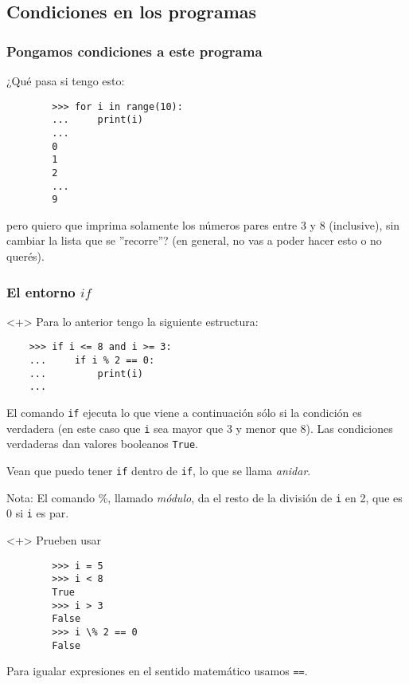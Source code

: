 \documentclass{beamer}
\begin{document}
\subsection{Condiciones en los programas}

\begin{frame}[fragile]
    \frametitle{Pongamos condiciones a este programa}
    ¿Qué pasa si tengo esto:
    \begin{verbatim}
        >>> for i in range(10):
        ...     print(i)
        ...
        0
        1
        2
        ...
        9
    \end{verbatim}
    pero quiero que imprima solamente los números pares entre 3 y 8 (inclusive), sin cambiar la lista que se ''recorre''? \footnotesize{(en general, no vas a poder hacer esto o no querés)}.
\end{frame}

\begin{frame}[fragile]
    \frametitle{El entorno $if$}
    \begin{onlyenv}<+>
    Para lo anterior tengo la siguiente estructura:
    \begin{verbatim}
    >>> if i <= 8 and i >= 3:
    ...     if i % 2 == 0:
    ...         print(i)
    ...
    \end{verbatim}
    El comando \texttt{if} ejecuta lo que viene a continuación sólo si la condición es verdadera (en este caso que \texttt{i} sea mayor que 3 y menor que 8). Las condiciones verdaderas dan valores booleanos \texttt{True}. 
    
    Vean que puedo tener \texttt{if} dentro de \texttt{if}, lo que se llama \textit{anidar}. 
    
    \vspace{5mm}
    \tiny{Nota: El comando \%, llamado \textit{módulo}, da el resto de la división de \texttt{i} en 2, que es 0 si \texttt{i} es par.}
    \end{onlyenv}
    
    
    \begin{onlyenv}<+>
        Prueben usar
        \begin{verbatim}
        >>> i = 5
        >>> i < 8
        True
        >>> i > 3
        False
        >>> i \% 2 == 0
        False
        \end{verbatim}
        Para igualar expresiones en el sentido matemático usamos \texttt{==}.
    \end{onlyenv}
\end{frame}
\end{document}
